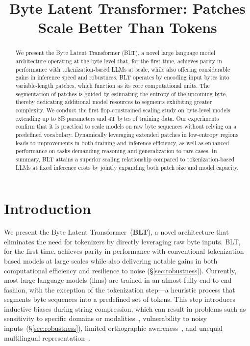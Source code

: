 \title{Byte Latent Transformer: Patches Scale Better Than Tokens}

\begin{abstract}
We present the Byte Latent Transformer ({\textsc BLT}), a novel large language model architecture operating at the byte level that, for the first time, achieves parity in performance with tokenization-based LLMs at scale, while also offering considerable gains in inference speed and robustness. {\textsc BLT} operates by encoding input bytes into variable-length patches, which function as its core computational units. The segmentation of patches is guided by estimating the entropy of the upcoming byte, thereby dedicating additional model resources to segments exhibiting greater complexity. We conduct the first flop-constrained scaling study on byte-level models extending up to 8B parameters and 4T bytes of training data. Our experiments confirm that it is practical to scale models on raw byte sequences without relying on a predefined vocabulary. Dynamically leveraging extended patches in low-entropy regions leads to improvements in both training and inference efficiency, as well as enhanced performance on tasks demanding reasoning and generalization to rare cases. In summary, {\textsc BLT} attains a superior scaling relationship compared to tokenization-based LLMs at fixed inference costs by jointly expanding both patch size and model capacity.
\end{abstract}

\section{Introduction}
\label{section:intro}

We present the Byte Latent Transformer~(\textbf{BLT}), a novel architecture that eliminates the need for tokenizers by directly leveraging raw byte inputs. BLT, for the first time, achieves parity in performance with conventional tokenization-based models at large scales while also delivering notable gains in both computational efficiency and resilience to noise (\S\ref{sec:robustness}). 
Currently, most large language models (llms) are trained in an almost fully end-to-end fashion, with the exception of the tokenization step—a heuristic process that segments byte sequences into a predefined set of tokens. This step introduces inductive biases during string compression, which can result in problems such as sensitivity to specific domains or modalities~\citep{dagangetting}, vulnerability to noisy inputs~(\S\ref{sec:robustness}), limited orthographic awareness~\citep{edman2024cute}, and unequal multilingual representation~\citep{liang2023xlm,petrov2024language,limisiewicz2024myte}.


